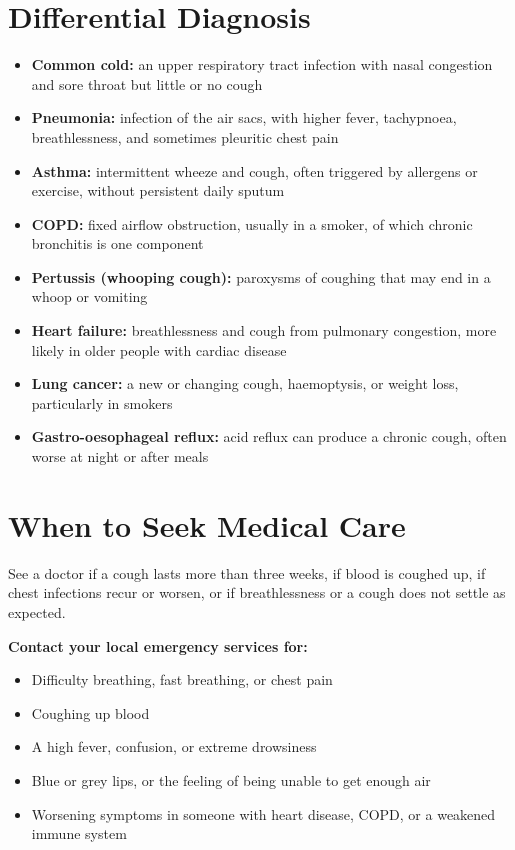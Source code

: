 \section*{Differential Diagnosis}
\begin{itemize}
    \item \textbf{Common cold:} an upper respiratory tract infection with nasal congestion and sore throat but little or no cough
    \item \textbf{Pneumonia:} infection of the air sacs, with higher fever, tachypnoea, breathlessness, and sometimes pleuritic chest pain
    \item \textbf{Asthma:} intermittent wheeze and cough, often triggered by allergens or exercise, without persistent daily sputum
    \item \textbf{COPD:} fixed airflow obstruction, usually in a smoker, of which chronic bronchitis is one component
    \item \textbf{Pertussis (whooping cough):} paroxysms of coughing that may end in a whoop or vomiting
    \item \textbf{Heart failure:} breathlessness and cough from pulmonary congestion, more likely in older people with cardiac disease
    \item \textbf{Lung cancer:} a new or changing cough, haemoptysis, or weight loss, particularly in smokers
    \item \textbf{Gastro-oesophageal reflux:} acid reflux can produce a chronic cough, often worse at night or after meals
\end{itemize}

\section*{When to Seek Medical Care}
See a doctor if a cough lasts more than three weeks, if blood is coughed up, if chest infections recur or worsen, or if breathlessness or a cough does not settle as expected.

\textbf{Contact your local emergency services for:}
\begin{itemize}
    \item Difficulty breathing, fast breathing, or chest pain
    \item Coughing up blood
    \item A high fever, confusion, or extreme drowsiness
    \item Blue or grey lips, or the feeling of being unable to get enough air
    \item Worsening symptoms in someone with heart disease, COPD, or a weakened immune system
\end{itemize}

